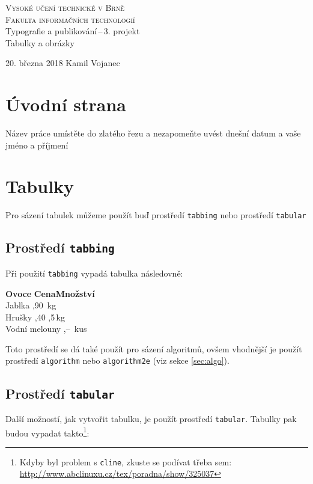 \documentclass[11pt,a4paper]{article}
\begin{document}
\begin{titlepage}
\begin{center}
\Huge
\textsc{\Huge{Vysoké učení technické v Brně} \\\huge Fakulta informačních technologií}\\
\LARGE Typografie a publikování\,--\,3. projekt\\
\Huge Tabulky a obrázky
\vfill
\end{center}
{\LARGE 20. března 2018 \hfill
Kamil Vojanec}

\end{titlepage}

\section{Úvodní strana}
Název práce umístěte do zlatého řezu a nezapomeňte uvést dnešní datum a vaše jméno a příjmení

\section{Tabulky}
Pro sázení tabulek můžeme použít buď prostředí \texttt{tabbing} nebo prostředí \texttt{tabular}

\subsection{Prostředí \texttt{tabbing}}
Při použití \texttt{tabbing} vypadá tabulka následovně:
\begin{tabbing}
\textbf{Ovoce}\hspace{2cm}   \=\textbf{Cena}\quad    \=\textbf{Množství}\\
Jablka              ,90        \,kg \\
Hrušky              ,40        ,5\,kg\\
Vodní melouny       ,--        \,kus\\
\end{tabbing}
Toto prostředí se dá také použít pro sázení algoritmů, ovšem vhodnější je použít 
prostředí \texttt{algorithm} nebo \texttt{algorithm2e} (viz sekce \ref{sec:algo}).

\subsection{Prostředí \texttt{tabular}}
Další možností, jak vytvořit tabulku, je použít prostředí \texttt{tabular}. Tabulky pak 
budou vypadat takto\footnote{Kdyby byl problem s \texttt{cline}, zkuste se podívat třeba sem: 
\url{http://www.abclinuxu.cz/tex/poradna/show/325037}}:
\end{document}
